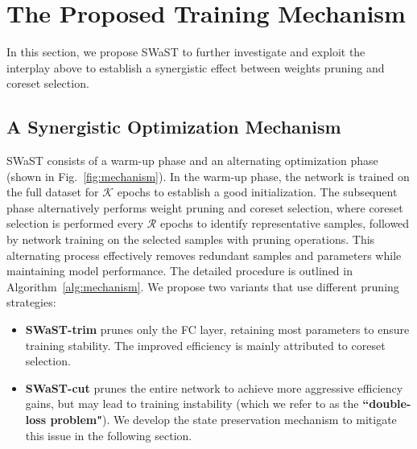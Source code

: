 \section{The Proposed Training Mechanism} 
In this section, we propose SWaST to further investigate and exploit the interplay above to establish a synergistic effect between weights pruning and coreset selection.

\subsection{A Synergistic Optimization Mechanism}
\label{sec:3-1}
SWaST consists of a warm-up phase and an alternating optimization phase (shown in Fig.~\ref{fig:mechanism}). 
In the warm-up phase, the network is trained on the full dataset for \(\mathcal{K}\) epochs to establish a good initialization. 
The subsequent phase alternatively performs weight pruning and coreset selection, where coreset selection is performed every \(\mathcal{R}\) epochs to identify representative samples,
followed by network training on the selected samples with pruning operations. This alternating process effectively removes redundant samples and parameters while maintaining model performance. The detailed procedure is outlined in Algorithm~\ref{alg:mechanism}.
We propose two variants that use different pruning strategies: 
\begin{itemize}
    \item[(i)] \textbf{SWaST-trim} prunes only the FC layer, retaining most parameters to ensure training stability. The improved efficiency is mainly attributed to coreset selection.
    \item[(ii)] \textbf{SWaST-cut} prunes the entire network to achieve more aggressive efficiency gains, but may lead to training instability (which we refer to as the \textbf{“double-loss problem"}). We develop the state preservation mechanism to mitigate this issue in the following section.
\end{itemize}


